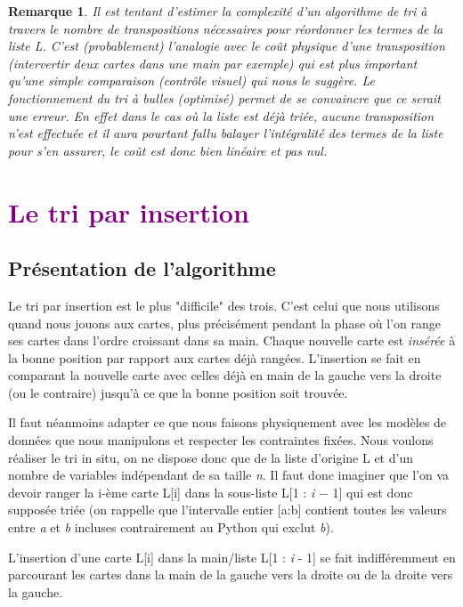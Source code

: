 \documentclass[a4paper,10pt]{article}
\newtheorem{remarque}{Remarque}
\begin{document}
\begin{remarque}
    Il est tentant d'estimer la complexité d'un algorithme de tri à travers le nombre de transpositions 
    nécessaires pour réordonner les termes de la liste L. C'est (probablement) l'analogie avec le coût physique 
    d'une transposition (intervertir deux cartes dans une main par exemple) qui est plus important qu'une simple 
    comparaison (contrôle visuel) qui nous le suggère. Le fonctionnement du tri à bulles (optimisé) permet de se 
    convaincre que ce serait une erreur. En effet dans le cas où la liste est déjà triée, aucune transposition n'est 
    effectuée et il aura pourtant fallu balayer l'intégralité des termes de la liste pour s'en assurer, 
    le coût est donc bien linéaire et pas nul.
\end{remarque}

\section{\textcolor{purple}{Le tri par insertion}}
\subsection{Présentation de l'algorithme}
Le tri par insertion est le plus "difficile" des trois. C'est celui que nous utilisons quand nous jouons aux cartes, 
plus précisément pendant la phase où l'on range ses cartes dans l'ordre croissant dans sa main. 
Chaque nouvelle carte est {\itshape insérée} à la bonne position par rapport aux cartes déjà rangées. 
L'insertion se fait en comparant la nouvelle carte avec celles déjà en main de la gauche vers la droite (ou le contraire) 
jusqu'à ce que la bonne position soit trouvée.

Il faut néanmoins adapter ce que nous faisons physiquement avec les modèles de données que nous 
manipulons et respecter les contraintes fixées. Nous voulons réaliser le tri in situ, on ne dispose donc que 
de la liste d'origine L et d'un nombre de variables indépendant de sa taille {\itshape n}.
Il faut donc imaginer que l'on va devoir ranger la i-ème carte L[i] dans la sous-liste L[1 : {\itshape i} $-$ 1]
qui est donc supposée triée (on rappelle que l'intervalle entier [a:b] contient toutes les valeurs entre {\itshape a} et 
{\itshape b} incluses contrairement au Python qui exclut {\itshape b}).

L'insertion d'une carte L[i] dans la main/liste L[1 : {\itshape i} - 1] se fait indifféremment en 
parcourant les cartes dans la main de la gauche vers la droite ou de la droite vers la gauche. 
\end{document}

